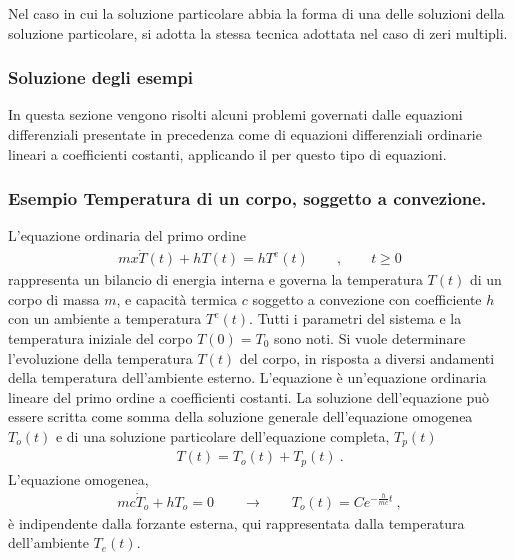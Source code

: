 \documentclass[letterpaper,10pt,italian]{jupyterBook}
\begin{document}
\sphinxAtStartPar
Nel caso in cui la soluzione particolare abbia la forma di una delle soluzioni della soluzione particolare, si adotta la stessa tecnica adottata nel caso di zeri multipli.


\subsubsection{Soluzione degli esempi}
\label{\detokenize{ch/ode:soluzione-degli-esempi}}\label{\detokenize{ch/ode:ode-hs-types-linear-const-ex-sol}}
\sphinxAtStartPar
In questa sezione vengono risolti alcuni problemi governati dalle equazioni differenziali presentate in precedenza come {\hyperref[\detokenize{ch/ode:ode-hs-types-linear-const-ex}]{}} di equazioni differenziali ordinarie lineari a coefficienti costanti, applicando il {\hyperref[\detokenize{ch/ode:ode-hs-types-linear-const-sol}]{}} per questo tipo di equazioni.
\subsubsection*{Esempio \sphinxhyphen{} Temperatura di un corpo, soggetto a convezione.}

\sphinxAtStartPar
L’equazione ordinaria del primo ordine
\begin{equation*}
\begin{split}m x \dot{T}(t) + h T(t) = h T^e(t) \qquad , \qquad t \ge 0\end{split}
\end{equation*}
\sphinxAtStartPar
rappresenta un bilancio di energia interna e governa la temperatura \(T(t)\) di un corpo di massa \(m\), e capacità termica \(c\) soggetto a convezione con coefficiente \(h\) con un ambiente a temperatura \(T^e(t)\). Tutti i parametri del sistema e la temperatura iniziale del corpo \(T(0) = T_0\) sono noti. Si vuole determinare l’evoluzione della temperatura \(T(t)\) del corpo, in risposta a diversi andamenti della temperatura dell’ambiente esterno.
L’equazione è un’equazione ordinaria lineare del primo ordine a coefficienti costanti. La soluzione dell’equazione può essere scritta come somma della soluzione generale dell’equazione omogenea \(T_o(t)\) e di una soluzione particolare dell’equazione completa, \(T_p(t)\)
\begin{equation*}
\begin{split}T(t) = T_{o}(t) + T_p(t) \ .\end{split}
\end{equation*}
\sphinxAtStartPar
{} L’equazione omogenea,
\begin{equation*}
\begin{split}m c \dot{T}_o + h T_o = 0 \qquad \rightarrow \qquad T_o(t) = C e^{-\frac{h}{mc}t} \ ,\end{split}
\end{equation*}
\sphinxAtStartPar
è indipendente dalla forzante esterna, qui rappresentata dalla temperatura dell’ambiente \(T_e(t)\).
\end{document}

